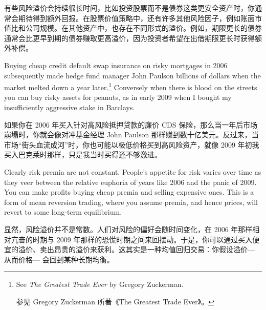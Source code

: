 \begin{chineseblock}有些风险溢价会持续很长时间，比如投资股票而不是债券这类更安全资产时，你通常会期待得到额外回报。在股票价值策略中，还有许多其他风险因子，例如账面市值比和公司规模。在其他资产中，也存在不同形式的溢价。例如，期限更长的债券通常会比更早到期的债券赚取更高溢价，因为投资者希望在出借期限更长时获得额外补偿。\end{chineseblock}


\begin{englishblock} Buying cheap credit default swap insurance on risky mortgages in 2006 subsequently made hedge fund manager John Paulson billions of dollars when the market melted down a year later.\footnote{See \textit{The Greatest Trade Ever} by Gregory Zuckerman. \par 参见 Gregory Zuckerman 所著《The Greatest Trade Ever》。} Conversely when there is blood on the streets you can buy risky assets for peanuts, as in early 2009 when I bought my insufficiently aggressive stake in Barclays. \end{englishblock}

\begin{chineseblock}如果你在 2006 年买入针对高风险抵押贷款的廉价 CDS 保险，那么当一年后市场崩塌时，你就会像对冲基金经理 John Paulson 那样赚到数十亿美元。反过来，当市场“街头血流成河”时，你也可能以极低价格买到高风险资产，就像 2009 年初我买入巴克莱时那样，只是我当时买得还不够激进。\end{chineseblock}

\bipairgap

\begin{englishblock} Clearly risk premia are not constant. People's appetite for risk varies over time as they veer between the relative euphoria of years like 2006 and the panic of 2009. You can make profits buying cheap premia and selling expensive ones. This is a form of mean reversion trading, where you assume premia, and hence prices, will revert to some long-term equilibrium. \end{englishblock}

\begin{chineseblock}显然，风险溢价并不是常数。人们对风险的偏好会随时间变化，在 2006 年那样相对亢奋的时期与 2009 年那样的恐慌时期之间来回摆动。于是，你可以通过买入便宜的溢价、卖出昂贵的溢价来获利。这其实是一种均值回归交易：你假设溢价--- 从而价格--- 会回到某种长期均衡。\end{chineseblock}

